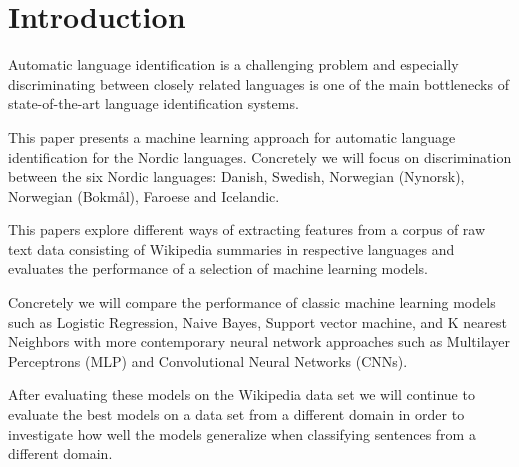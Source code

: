 \section{Introduction}
Automatic language identification is a challenging problem and especially discriminating between closely related languages is one of the main bottlenecks of state-of-the-art language identification systems.\cite{DSL2014}

This paper presents a machine learning approach for automatic language identification for the Nordic languages. Concretely we will focus on discrimination between the six Nordic languages: Danish, Swedish, Norwegian (Nynorsk), Norwegian (Bokmål), Faroese and Icelandic.

This papers explore different ways of extracting features from a corpus of raw text data consisting of Wikipedia summaries in respective languages and evaluates the performance of a selection of machine learning models.

Concretely we will compare the performance of classic machine learning models such as Logistic Regression, Naive Bayes, Support vector machine, and K nearest Neighbors with more contemporary neural network approaches such as Multilayer Perceptrons (MLP) and Convolutional Neural Networks (CNNs).

After evaluating these models on the Wikipedia data set we will continue to evaluate the best models on a data set from a different domain in order to investigate how well the models generalize when classifying sentences from a different domain.
